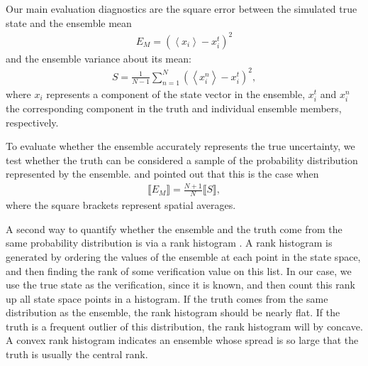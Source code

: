 Our main evaluation diagnostics are the square error between the simulated true state and the ensemble mean
\begin{eqnarray}
E_M = \left(
\left< x_i \right>-x_{i}^{t}
\right)^2
\end{eqnarray}
and the ensemble variance about its mean:
\begin{eqnarray}
S = 
\frac{1}{N-1}
\sum_{n=1}^N
\left(
	\left< x_{i}^{n} \right>-x_i^t
\right)^2,
\label{eq:spread}
\end{eqnarray}
where $x_{i}$ represents a component of the state vector in the ensemble,  $x_{i}^t$ and $x_{i}^n$ the corresponding component in the truth and individual ensemble members, respectively.

To evaluate whether the ensemble accurately represents the true uncertainty, we  test whether the truth can be considered a sample of the probability distribution represented by the ensemble.
 \citet{Huntley2009} and \citet{Murphy1988} pointed out that this is the case when 
\begin{eqnarray}
\llbracket E_M \rrbracket = \frac{N+1}{N} \llbracket S \rrbracket, 
\label{eq:EvsS}
\end{eqnarray}
where the square brackets represent spatial averages. 

A second way to quantify whether the ensemble and the truth come from the same probability distribution is via a rank histogram \citep[and references therein]{Hamill2001}.
A rank histogram is generated by ordering the values of the ensemble at each point in the state space, and then finding the rank of some verification value on this list.
In our case, we use the true state as the verification, since it is known,
and then count this rank up all state space points in a histogram. 
If the truth comes from the same distribution as the ensemble, the rank histogram should be nearly flat.  
If the truth is a frequent outlier of this distribution, the rank histogram will by concave.
A convex rank histogram indicates an ensemble whose spread is so large that the truth is usually the central rank. 

